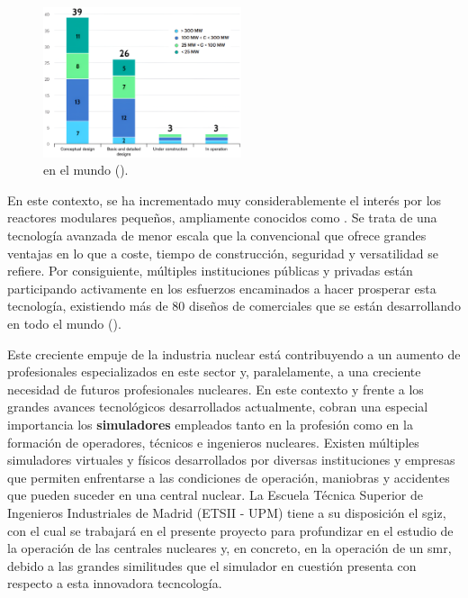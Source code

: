     \begin{figure}
      \vspace{-0.5cm}
      \centering
      \includegraphics[width=0.52\textwidth]{content/figures/global_smr_projects2.png}
      \caption{ en el mundo (\cite{iea_global_smr_projects}).}
      \label{fig:global_smr_projects}
      \vspace{-1cm}
    \end{figure}

    En este contexto, se ha incrementado muy considerablemente el interés por los reactores modulares pequeños, ampliamente conocidos como \textbf{\emph{}}. Se trata de una tecnología avanzada de menor escala que la convencional que ofrece grandes ventajas en lo que a coste, tiempo de construcción, seguridad y versatilidad se refiere. Por consiguiente, múltiples instituciones públicas y privadas están participando activamente en los esfuerzos encaminados a hacer prosperar esta tecnología, existiendo más de 80 diseños de  comerciales que se están desarrollando en todo el mundo (\cite{smr_oiea}).




    
\newpage 

Este creciente empuje de la industria nuclear está contribuyendo a un aumento de profesionales especializados en este sector y, paralelamente, a una creciente necesidad de futuros profesionales nucleares. En este contexto y frente a los grandes avances tecnológicos desarrollados actualmente, cobran una especial importancia los \textbf{simuladores} empleados tanto en la profesión como en la formación de operadores, técnicos e ingenieros nucleares. Existen múltiples simuladores virtuales y físicos desarrollados por diversas instituciones y empresas que permiten enfrentarse a las condiciones de operación, maniobras y accidentes que pueden suceder en una central nuclear. La Escuela Técnica Superior de Ingenieros Industriales de Madrid (ETSII - UPM) tiene a su disposición el \acrfull{sgiz}, con el cual se trabajará en el presente proyecto para profundizar en el estudio de la operación de las centrales nucleares y, en concreto, en la operación de un \acrshort{smr}, debido a las grandes similitudes que el simulador en cuestión presenta con respecto a esta innovadora tecncología.


